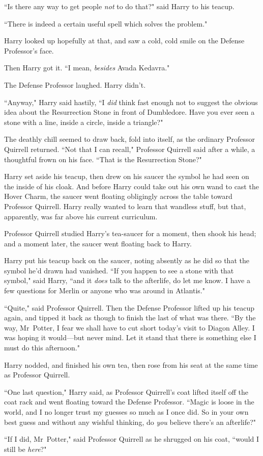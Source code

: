 ``Is there any way to get people \emph{not} to do that?" said Harry to his teacup.

``There is indeed a certain useful spell which solves the problem."

Harry looked up hopefully at that, and saw a cold, cold smile on the Defense Professor's face.

Then Harry got it. ``I mean, \emph{besides} Avada Kedavra."

The Defense Professor laughed. Harry didn't.

``Anyway," Harry said hastily, ``I \emph{did} think fast enough not to suggest the obvious idea about the Resurrection Stone in front of Dumbledore. Have you ever seen a stone with a line, inside a circle, inside a triangle?"

The deathly chill seemed to draw back, fold into itself, as the ordinary Professor Quirrell returned. ``Not that I can recall," Professor Quirrell said after a while, a thoughtful frown on his face. ``That is the Resurrection Stone?"

Harry set aside his teacup, then drew on his saucer the symbol he had seen on the inside of his cloak. And before Harry could take out his own wand to cast the Hover Charm, the saucer went floating obligingly across the table toward Professor Quirrell. Harry really wanted to learn that wandless stuff, but that, apparently, was far above his current curriculum.

Professor Quirrell studied Harry's tea-saucer for a moment, then shook his head; and a moment later, the saucer went floating back to Harry.

Harry put his teacup back on the saucer, noting absently as he did so that the symbol he'd drawn had vanished. ``If you happen to see a stone with that symbol," said Harry, ``and it \emph{does} talk to the afterlife, do let me know. I have a few questions for Merlin or anyone who was around in Atlantis."

``Quite," said Professor Quirrell. Then the Defense Professor lifted up his teacup again, and tipped it back as though to finish the last of what was there. ``By the way, Mr~Potter, I fear we shall have to cut short today's visit to Diagon Alley. I was hoping it would—but never mind. Let it stand that there is something else I must do this afternoon."

Harry nodded, and finished his own tea, then rose from his seat at the same time as Professor Quirrell.

``One last question," Harry said, as Professor Quirrell's coat lifted itself off the coat rack and went floating toward the Defense Professor. ``Magic is loose in the world, and I no longer trust my guesses so much as I once did. So in your own best guess and without any wishful thinking, do \emph{you} believe there's an afterlife?"

``If I did, Mr~Potter," said Professor Quirrell as he shrugged on his coat, ``would I still be \emph{here}?"


